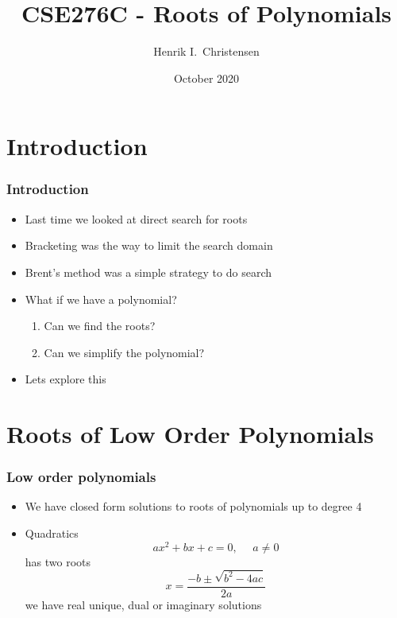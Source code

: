 \documentclass[10pt]{beamer}
\title[Math for Robotics] %
{CSE276C - Roots of Polynomials}
\author[H.~I. Christensen] %
{Henrik I.~Christensen}
\institute[UCSD] %
{
  \begin{minipage}[c]{.2\textwidth}
    \texttt{[image: ucsealnew]}%
  \end{minipage}%
  \begin{minipage}[c]{.6\textwidth}
    \small
      Computer Science and Engineering\\
      University of California, San Diego\\
      \myemph{\url{http://cri.ucsd.edu}}\\          

  \end{minipage}
}
\date[Oct 2020]%
{\small%
  October 2020}
\begin{document}
  


\begin{frame}[plain]
  \titlepage
\end{frame}

\section{Introduction}

\begin{frame}
  \frametitle{Introduction}
  \begin{itemize}
  \item Last time we looked at direct search for roots
  \item Bracketing was the way to limit the search domain
  \item Brent's method was a simple strategy to do search
  \item What if we have a polynomial?
    \begin{enumerate}
    \item Can we find the roots?
    \item Can we simplify the polynomial?
    \end{enumerate}
  \item Lets explore this
  \end{itemize}
\end{frame}

\section{Roots of Low Order Polynomials}

\begin{frame}
  \frametitle{Low order polynomials}
  \begin{itemize}
  \item We have closed form solutions to roots of polynomials up to degree 4
  \item Quadratics
    \[
      ax^2 + bx +c = 0, \mbox{~~~~} a\neq0
    \]
    has two roots
    \[
      x = \frac{-b \pm \sqrt{b^2 - 4ac}}{2a}
    \]
    we have real unique, dual or imaginary solutions
  \end{itemize}
\end{frame}
\end{document}
